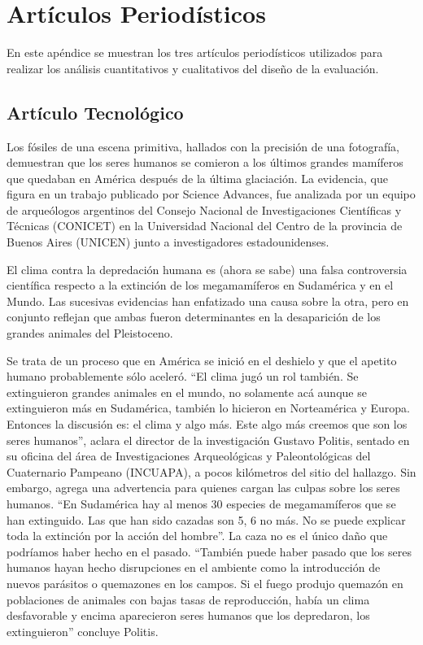\chapter{Artículos Periodísticos }
\label{sec:apendiceA}

En este apéndice se muestran los tres artículos periodísticos utilizados para realizar los análisis cuantitativos y cualitativos del diseño de la evaluación.

\section{Artículo Tecnológico}
\label{cap:sec:articulotecnologico}
Los fósiles de una escena primitiva, hallados con la precisión de una fotografía, demuestran que los seres humanos se comieron a los últimos grandes mamíferos que quedaban en América después de la última glaciación. La evidencia, que figura en un trabajo publicado por Science Advances, fue analizada por un equipo de arqueólogos argentinos del Consejo Nacional de Investigaciones Científicas y Técnicas (CONICET) en la Universidad Nacional del Centro de la provincia de Buenos Aires (UNICEN) junto a investigadores estadounidenses.

El clima contra la depredación humana es (ahora se sabe) una falsa controversia científica respecto a la extinción de los megamamíferos en Sudamérica y en el Mundo. Las sucesivas evidencias han enfatizado una causa sobre la otra, pero en conjunto reflejan que ambas fueron determinantes en la desaparición de los grandes animales del Pleistoceno.

Se trata de un proceso que en América se inició en el deshielo y que el apetito humano probablemente sólo aceleró. ``El clima jugó un rol también. Se extinguieron grandes animales en el mundo, no solamente acá aunque se extinguieron más en Sudamérica, también lo hicieron en Norteamérica y Europa. Entonces la discusión es: el clima y algo más. Este algo más creemos que son los seres humanos'', aclara el director de la investigación Gustavo Politis, sentado en su oficina del área de Investigaciones Arqueológicas y Paleontológicas del Cuaternario Pampeano (INCUAPA), a pocos kilómetros del sitio del hallazgo. Sin embargo, agrega una advertencia para quienes cargan las culpas sobre los seres humanos. ``En Sudamérica hay al menos 30 especies de megamamíferos que se han extinguido. Las que han sido cazadas son 5, 6 no más. No se puede explicar toda la extinción por la acción del hombre''. La caza no es el único daño que podríamos haber hecho en el pasado. ``También puede haber pasado que los seres humanos hayan hecho disrupciones en el ambiente como la introducción de nuevos parásitos o quemazones en los campos. Si el fuego produjo quemazón en poblaciones de animales con bajas tasas de reproducción, había un clima desfavorable y encima aparecieron seres humanos que los depredaron, los extinguieron'' concluye Politis.

